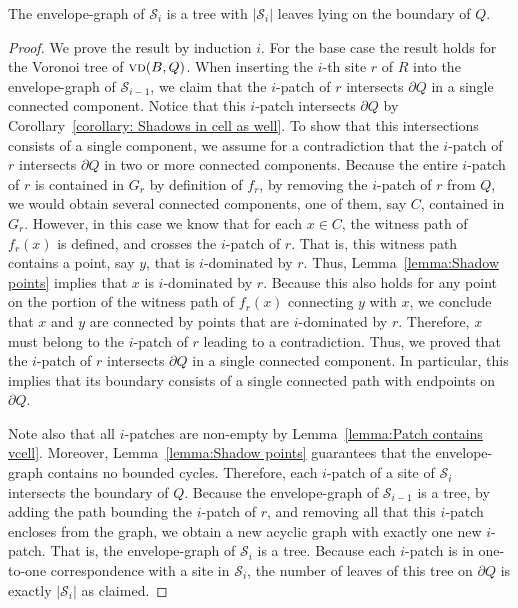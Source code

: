 \documentclass[a4paper,UKenglish]{socg-lipics-v2018}
\newcommand{\icell}[1][i]{${#1}$-patch\xspace}
\newcommand{\icells}[1][i]{${#1}$-patches\xspace}
\newcommand{\idom}[1][i]{${#1}$-dominated\xspace}
\newcommand{\s}{\mathcal S}
\newcommand{\vd}[2][P]{\textsc{vd}(#2, #1)}
\begin{document}
\begin{lemma}\label{lemma:Structure of the envelope}
The envelope-graph of $\s_i$ is a tree with $|\s_i|$ leaves lying on the boundary of $Q$.
\end{lemma}
\begin{proof}
We prove the result by induction $i$. For the base case the result holds for the Voronoi tree of $\vd[Q]{B}$.
When inserting the $i$-th site $r$ of $R$ into the envelope-graph of $\s_{i-1}$, we claim that the \icell of $r$ intersects $\partial Q$ in a single connected component.
Notice that this \icell intersects $\partial Q$ by Corollary~\ref{corollary: Shadows in cell as well}.
To show that this intersections consists of a single component, we assume for a contradiction that the \icell of $r$ intersects $\partial Q$ in two or more connected components. 
Because the entire \icell of $r$ is contained in $G_r$ by definition of $f_r$,  by removing the \icell of $r$ from $Q$, we would obtain several connected components, one of them, say $C$, contained in $G_r$. However, in this case we know that for each $x\in C$, the witness path of $f_r(x)$ is defined, and crosses the \icell of $r$. 
That is, this witness path contains a point, say $y$, that is \idom by $r$. 
Thus, Lemma~\ref{lemma:Shadow points} implies that $x$ is \idom by $r$. 
Because this also holds for any point on the portion of the witness path of $f_r(x)$ connecting $y$ with $x$, 
we conclude that $x$ and $y$ are connected by points that are \idom by $r$. 
Therefore, $x$ must belong to the \icell of $r$ leading to a contradiction. 
Thus, we proved that the \icell of $r$ intersects $\partial Q$ in a single connected component. 
In particular, this implies that its boundary consists of a single connected path with endpoints on $\partial Q$.

Note also that all \icells are non-empty by Lemma~\ref{lemma:Patch contains vcell}.
Moreover, Lemma~\ref{lemma:Shadow points} guarantees that the envelope-graph contains no bounded cycles. 
Therefore, each \icell of a site of $\s_i$ intersects the boundary of $Q$. 
Because the envelope-graph of $\s_{i-1}$ is a tree, by adding the path bounding the \icell of $r$, and removing all that this \icell encloses from the graph,
we obtain a new acyclic graph with exactly one new \icell. That is, the envelope-graph of $\s_i$ is a tree.
Because each \icell is in one-to-one correspondence with a site in $\s_i$, the number of leaves of this tree on $\partial Q$ is exactly $|\s_i|$ as claimed.
\end{proof}
\end{document}
